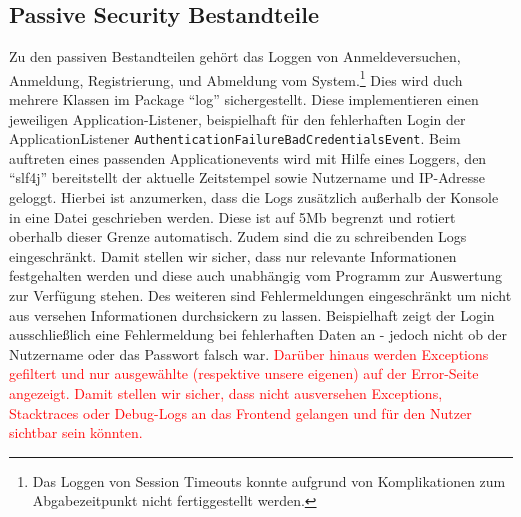 \subsection{Passive Security Bestandteile}
Zu den passiven Bestandteilen gehört das Loggen von Anmeldeversuchen, Anmeldung, Registrierung, und Abmeldung vom System.\footnote{Das Loggen von Session Timeouts konnte aufgrund von Komplikationen zum Abgabezeitpunkt nicht fertiggestellt werden.}
Dies wird duch mehrere Klassen im Package \enquote{log} sichergestellt. Diese implementieren einen jeweiligen Application-Listener, beispielhaft für den fehlerhaften Login der ApplicationListener \texttt{AuthenticationFailureBadCredentialsEvent}. Beim auftreten eines passenden Applicationevents wird mit Hilfe eines Loggers, den \enquote{slf4j} bereitstellt der aktuelle Zeitstempel sowie Nutzername und IP-Adresse geloggt.
Hierbei ist anzumerken, dass die Logs zusätzlich außerhalb der Konsole in eine Datei geschrieben werden. Diese ist auf 5Mb begrenzt und rotiert oberhalb dieser Grenze automatisch.
Zudem sind die zu schreibenden Logs eingeschränkt.
Damit stellen wir sicher, dass nur relevante Informationen festgehalten werden und diese auch unabhängig vom Programm zur Auswertung zur Verfügung stehen.
Des weiteren sind Fehlermeldungen eingeschränkt um nicht aus versehen Informationen durchsickern zu lassen. Beispielhaft zeigt der Login ausschließlich eine Fehlermeldung bei fehlerhaften Daten an - jedoch nicht ob der Nutzername oder das Passwort falsch war.
\textcolor{red}{Darüber hinaus werden Exceptions gefiltert und nur ausgewählte (respektive unsere eigenen) auf der Error-Seite angezeigt. Damit stellen wir sicher, dass nicht ausversehen Exceptions, Stacktraces oder Debug-Logs an das Frontend gelangen und für den Nutzer sichtbar sein könnten.}
